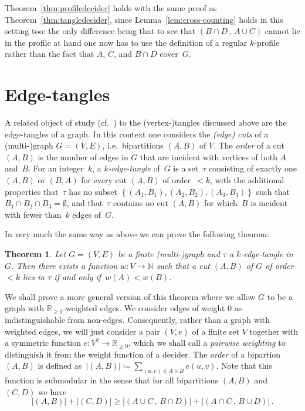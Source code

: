 \documentclass[11pt]{article}
\newtheorem{THM}{Theorem}
\theoremstyle{definition}
\newcommand{\N}{\mathbb{N}}
\newcommand{\R}{\mathbb{R}}
\newcommand{\menge}[1]{\left\{#1\right\}}
\begin{document}
Theorem~\ref{thm:profiledecider} holds with the same proof as Theorem~\ref{thm:tangledecider}, since Lemma~\ref{lem:cross-counting} holds in this setting too: the only difference being that to see that $ (B\cap D\,,\,A\cup C) $ cannot lie in the profile at hand one now has to use the definition of a regular $ k $-profile rather than the fact that $ A $, $ C $, and $ B\cap D $ cover~$ G $.

\section{Edge-tangles}\label{sec:edgetangles}

A related object of study (cf.~\cites{liu_packing_2015,diestel_tangle-tree_2017}) to the (vertex-)tangles discussed above are the edge-tangles of a graph. In this context one considers the \emph{(edge) cuts} of a (multi-)graph $ G = (V,E) $, i.e.\ bipartitions $ (A,B) $ of $ V $. The \emph{order} of a cut $ (A,B) $ is the number of edges in $ G $ that are incident with vertices of both $ A $ and~$ B $.
For an integer~$ k $, a \emph{$ k $-edge-tangle} of~$ G $ is a set~$ \tau $ consisting of exactly one $ (A,B) $ or $ (B,A) $ for every cut $ (A,B) $ of order~$ < k $, with the additional properties that~$ \tau $ has no subset $ \menge{(A_1,B_1), (A_2,B_2), (A_3,B_3)} $ such that $ B_1\cap B_2\cap B_3=\emptyset $, and that~$ \tau $ contains no cut $ (A,B) $ for which~$ B $ is incident with fewer than~$ k $ edges of~$ G $.

In very much the same way as above we can prove the following theorem:

\begin{THM}\label{thm:edgetangledecider}
	Let $ G=(V,E) $ be a finite (multi-)graph and $ \tau $ a $ k $-edge-tangle in $ G $. Then there exists a function $ w\colon V\to\N $ such that a cut $ (A,B) $ of $ G $ of order $ <k $ lies in $ \tau $ if and only if~$ w(A)<w(B) $.
\end{THM}

We shall prove a more general version of this theorem where we allow $ G $ to be a graph with $ \R_{\ge 0} $\nobreakdash-weighted edges. We consider edges of weight $ 0 $ as indistinguishable from non-edges. Consequently, rather than a graph with weighted edges, we will just consider a pair $ (V, e) $ of a finite set $ V $ together with a symmetric function $ e \colon V^2 \to \R_{\ge 0} $, which we shall call a \emph{pairwise weighting} to distinguish it from the weight function of a decider. The \emph{order} of a bipartion $ (A,B) $ is defined as~$ |(A,B)| \coloneqq \sum_{(u,v)\in A\times B} e(u,v)$.
Note that this function is submodular in the sense that for all bipartitions $ (A,B) $ and $ (C,D) $ we have
\[ |(A,B)| + |(C,D)| \ge |(A \cup C\,,\, B \cap D)| + |(A \cap C\,,\, B \cup D)|\,.  \]
\end{document}

